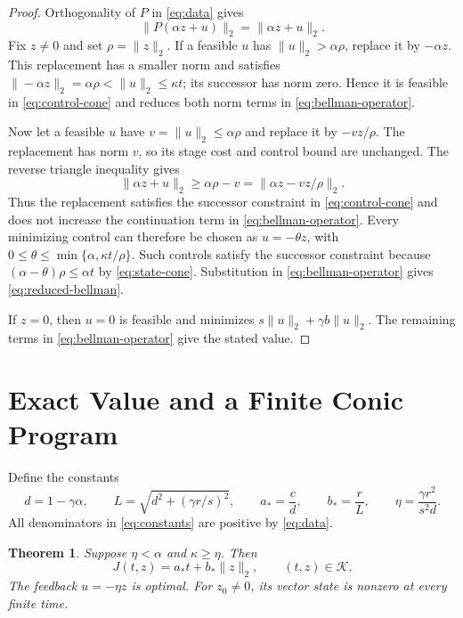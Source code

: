 \documentclass[10pt]{article}
\newtheorem{theorem}{Theorem}
\begin{document}
\begin{proof}
Orthogonality of $P$ in \eqref{eq:data} gives
\begin{equation}
\|P(\alpha z+u)\|_2=\|\alpha z+u\|_2.
\label{eq:orthogonal-norm}
\end{equation}
Fix $z\ne0$ and set $\rho=\|z\|_2$. If a feasible $u$ has $\|u\|_2>\alpha\rho$, replace it by $-\alpha z$. This replacement has a smaller norm and satisfies $\|-\alpha z\|_2=\alpha\rho<\|u\|_2\leq\kappa t$; its successor has norm zero. Hence it is feasible in \eqref{eq:control-cone} and reduces both norm terms in \eqref{eq:bellman-operator}.

Now let a feasible $u$ have $v=\|u\|_2\leq\alpha\rho$ and replace it by $-v z/\rho$. The replacement has norm $v$, so its stage cost and control bound are unchanged. The reverse triangle inequality gives
\begin{equation}
\|\alpha z+u\|_2\geq\alpha\rho-v
=\|\alpha z-vz/\rho\|_2.
\label{eq:radial-bound}
\end{equation}
Thus the replacement satisfies the successor constraint in \eqref{eq:control-cone} and does not increase the continuation term in \eqref{eq:bellman-operator}. Every minimizing control can therefore be chosen as $u=-\theta z$, with $0\leq\theta\leq\min\{\alpha,\kappa t/\rho\}$. Such controls satisfy the successor constraint because $(\alpha-\theta)\rho\leq\alpha t$ by \eqref{eq:state-cone}. Substitution in \eqref{eq:bellman-operator} gives \eqref{eq:reduced-bellman}.

If $z=0$, then $u=0$ is feasible and minimizes $s\|u\|_2+\gamma b\|u\|_2$. The remaining terms in \eqref{eq:bellman-operator} give the stated value.
\end{proof}

\section{Exact Value and a Finite Conic Program}

Define the constants
\begin{equation}
d=1-\gamma\alpha,\qquad
L=\sqrt{d^2+(\gamma r/s)^2},\qquad
a_*=\frac{c}{d},\qquad
b_*=\frac{r}{L},\qquad
\eta=\frac{\gamma r^2}{s^2d}.
\label{eq:constants}
\end{equation}
All denominators in \eqref{eq:constants} are positive by \eqref{eq:data}.

\begin{theorem}
\label{thm:exact}
Suppose $\eta<\alpha$ and $\kappa\geq\eta$. Then
\begin{equation}
J(t,z)=a_*t+b_*\|z\|_2,
\qquad (t,z)\in\mathcal K.
\label{eq:exact-value}
\end{equation}
The feedback $u=-\eta z$ is optimal. For $z_0\ne0$, its vector state is nonzero at every finite time.
\end{theorem}
\end{document}
